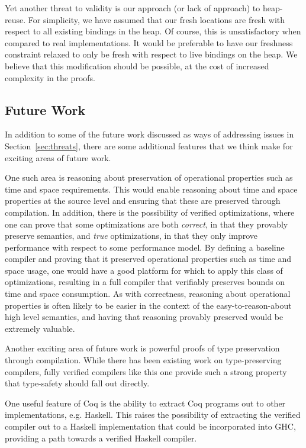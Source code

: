 Yet another threat to validity is our approach (or lack of approach) to
heap-reuse. For simplicity, we have assumed that our fresh locations are fresh
with respect to all existing bindings in the heap. Of course, this is
unsatisfactory when compared to real implementations. It would be preferable to
have our freshness constraint relaxed to only be fresh with respect to live
bindings on the heap. We believe that this modification should be possible, at
the cost of increased complexity in the proofs. 

\subsection{Future Work}

In addition to some of the future work discussed as ways of addressing issues 
in Section~\ref{sec:threats}, there are some additional features that we think
make for exciting areas of future work. 

One such area is reasoning about preservation of operational properties such as
time and space requirements. This would enable reasoning about time and space
properties at the source level and ensuring that these are preserved through
compilation. In addition, there is the possibility of verified optimizations,
where one can prove that some optimizations are both \emph{correct}, in that
they provably preserve semantics, and \emph{true} optimizations, in that they
only improve performance with respect to some performance model. By defining a
baseline compiler and proving that it preserved operational properties such as
time and space usage, one would have a good platform for which to apply this
class of optimizations, resulting in a full compiler that verifiably preserves 
bounds on time and space consumption. As with correctness, reasoning about
operational properties is often likely to be easier in the context of the
easy-to-reason-about high level semantics, and having that reasoning provably
preserved would be extremely valuable. 

Another exciting area of future work is powerful proofs of type preservation
through compilation.  While there has been existing work on type-preserving
compilers, fully verified compilers like this one provide such a strong property
that type-safety should fall out directly.

One useful feature of Coq is the ability to extract Coq programs out to other
implementations, e.g. Haskell. This raises the possibility of extracting the
verified compiler out to a Haskell implementation that could be incorporated
into GHC, providing a path towards a verified Haskell compiler. 

